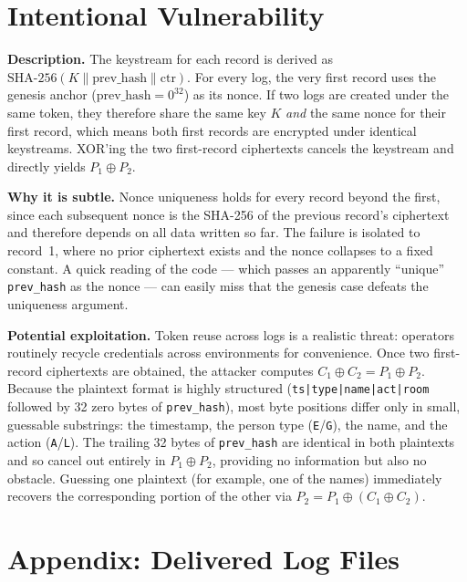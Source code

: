 \documentclass[a4paper, 12pt]{article}
\begin{document}
    \section{Intentional Vulnerability} \label{sec:intentional-vuln}

    \textbf{Description.} The keystream for each record is derived as $\text{SHA-256}(K \| \text{prev\_hash} \| \text{ctr})$. For every log, the very first record uses the genesis anchor ($\text{prev\_hash} = 0^{32}$) as its nonce. If two logs are created under the same token, they therefore share the same key $K$ \emph{and} the same nonce for their first record, which means both first records are encrypted under identical keystreams. XOR'ing the two first-record ciphertexts cancels the keystream and directly yields $P_1 \oplus P_2$.

    \textbf{Why it is subtle.} Nonce uniqueness holds for every record beyond the first, since each subsequent nonce is the SHA-256 of the previous record's ciphertext and therefore depends on all data written so far. The failure is isolated to record~1, where no prior ciphertext exists and the nonce collapses to a fixed constant. A quick reading of the code --- which passes an apparently ``unique'' \texttt{prev\_hash} as the nonce --- can easily miss that the genesis case defeats the uniqueness argument.

    \textbf{Potential exploitation.} Token reuse across logs is a realistic threat: operators routinely recycle credentials across environments for convenience. Once two first-record ciphertexts are obtained, the attacker computes $C_1 \oplus C_2 = P_1 \oplus P_2$. Because the plaintext format is highly structured (\texttt{ts|type|name|act|room} followed by 32 zero bytes of \texttt{prev\_hash}), most byte positions differ only in small, guessable substrings: the timestamp, the person type (\texttt{E}/\texttt{G}), the name, and the action (\texttt{A}/\texttt{L}). The trailing 32 bytes of \texttt{prev\_hash} are identical in both plaintexts and so cancel out entirely in $P_1 \oplus P_2$, providing no information but also no obstacle. Guessing one plaintext (for example, one of the names) immediately recovers the corresponding portion of the other via $P_2 = P_1 \oplus (C_1 \oplus C_2)$.

    \section*{Appendix: Delivered Log Files}
\end{document}
